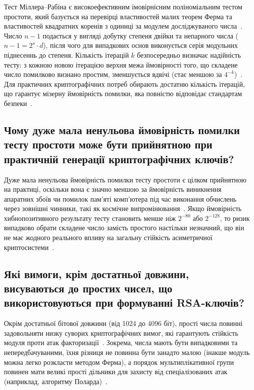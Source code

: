 Тест Міллера--Рабіна є високоефективним імовірнісним поліноміальним тестом простоти, який базується на
перевірці властивостей малих теорем Ферма та властивостей квадратних коренів з одиниці за модулем
досліджуваного числа~\cite{HAC}. Число $n-1$ подається у вигляді добутку степеня двійки та непарного числа
($n-1 = 2^s \cdot d$), після чого для випадкових основ виконується серія модульних піднесеннь до степеня.
Кількість ітерацій $k$ безпосередньо визначає надійність тесту: з кожною новою ітерацією верхня межа
ймовірності того, що складене число помилково визнано простим, зменшується вдвічі (стає меншою за
$4^{-k}$)~\cite{HAC}. Для практичних криптографічних потреб обирають достатню кількість ітерацій, що
гарантує мізерну ймовірність помилки, яка повністю відповідає стандартам безпеки~\cite{HAC, FIPS140-3}.

\subsection{Чому дуже мала ненульова ймовірність помилки тесту простоти може бути прийнятною при практичній генерації криптографічних ключів?}

Дуже мала ненульова ймовірність помилки тесту простоти є цілком прийнятною на практиці, оскільки вона є
значно меншою за ймовірність виникнення апаратних збоїв чи помилок пам'яті комп'ютера під час
виконання обчислень через зовнішні чинники, такі як космічне випромінювання~\cite{HAC, FIPS140-3}. Якщо
ймовірність хибнопозитивного результату тесту становить менше ніж $2^{-80}$ або $2^{-128}$, то ризик
випадково обрати складене число замість простого настільки незначний, що він не має жодного реального
впливу на загальну стійкість асиметричної криптосистеми~\cite{HAC}.

\subsection{Які вимоги, крім достатньої довжини, висуваються до простих чисел, що використовуються при формуванні RSA-ключів?}

Окрім достатньої бітової довжини (від 1024 до 4096 біт), прості числа повинні задовольняти низку суворих
криптографічних вимог, які гарантують стійкість модуля проти атак факторизації~\cite{HAC, SP800-56B}.
Зокрема, числа мають бути випадковими та непередбачуваними, їхня різниця не повинна бути занадто
малою (інакше модуль можна легко розкласти методом Ферма), а порядок мультиплікативної групи повинен
мати великі прості дільники для захисту від спеціалізованих атак (наприклад, алгоритму
Поларда)~\cite{HAC, SP800-56B}.

